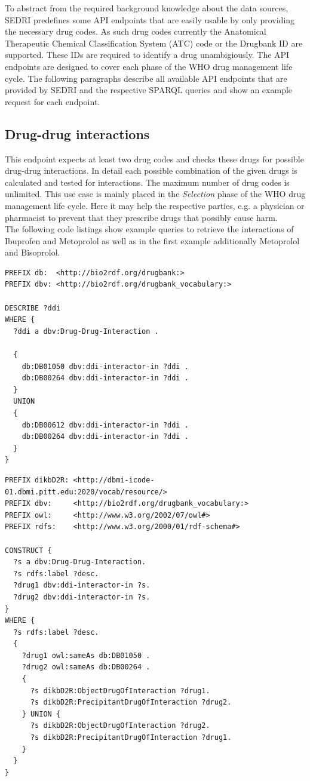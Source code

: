 To abstract from the required background knowledge about the data sources, SEDRI predefines some API endpoints that are easily usable by only providing the necessary drug codes.
As such drug codes currently the Anatomical Therapeutic Chemical Classification System (ATC) code or the Drugbank ID are supported.
These IDs are required to identify a drug unambigiously.
The API endpoints are designed to cover each phase of the WHO drug management life cycle.
The following paragraphs describe all available API endpoints that are provided by SEDRI and the respective SPARQL queries and show an example request for each endpoint.

\subsection*{Drug-drug interactions}
This endpoint expects at least two drug codes and checks these drugs for possible drug-drug interactions.
In detail each possible combination of the given drugs is calculated and tested for interactions.
The maximum number of drug codes is unlimited.
This use case is mainly placed in the \textit{Selection} phase of the WHO drug management life cycle.
Here it may help the respective parties, e.g. a physician or pharmacist to prevent that they prescribe drugs that possibly cause harm.\\
The following code listings show example queries to retrieve the interactions of Ibuprofen and Metoprolol as well as in the first example additionally Metoprolol and Bisoprolol.
\begin{lstlisting}[caption=Example Drugbank query for drug-drug interactions between Ibuprofen~--~Metoprolol and Bisoprolol -- Metoprolol]
PREFIX db:  <http://bio2rdf.org/drugbank:>
PREFIX dbv: <http://bio2rdf.org/drugbank_vocabulary:>

DESCRIBE ?ddi
WHERE {
  ?ddi a dbv:Drug-Drug-Interaction .
  
  {
    db:DB01050 dbv:ddi-interactor-in ?ddi .
    db:DB00264 dbv:ddi-interactor-in ?ddi .
  }
  UNION
  {
    db:DB00612 dbv:ddi-interactor-in ?ddi .
    db:DB00264 dbv:ddi-interactor-in ?ddi .
  }
}
\end{lstlisting}
\begin{lstlisting}[caption=Example DIKB query for drug-drug interactions between Ibuprofen and Metoprolol]
PREFIX dikbD2R: <http://dbmi-icode-01.dbmi.pitt.edu:2020/vocab/resource/>
PREFIX dbv:     <http://bio2rdf.org/drugbank_vocabulary:>
PREFIX owl:     <http://www.w3.org/2002/07/owl#>
PREFIX rdfs:    <http://www.w3.org/2000/01/rdf-schema#>

CONSTRUCT {
  ?s a dbv:Drug-Drug-Interaction.
  ?s rdfs:label ?desc.
  ?drug1 dbv:ddi-interactor-in ?s.
  ?drug2 dbv:ddi-interactor-in ?s.
}
WHERE {
  ?s rdfs:label ?desc.
  {
    ?drug1 owl:sameAs db:DB01050 .
    ?drug2 owl:sameAs db:DB00264 .
    {
      ?s dikbD2R:ObjectDrugOfInteraction ?drug1.
      ?s dikbD2R:PrecipitantDrugOfInteraction ?drug2.
    } UNION {
      ?s dikbD2R:ObjectDrugOfInteraction ?drug2.
      ?s dikbD2R:PrecipitantDrugOfInteraction ?drug1.
    }
  }
}
\end{lstlisting}

